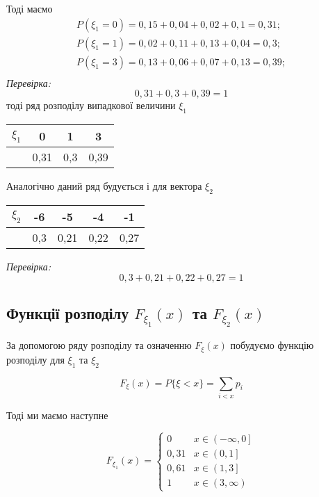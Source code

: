 \documentclass{article}
\begin{document}
	Тоді маємо
	$$
	\begin{gathered}
		P(\xi_1 = 0) = 0,15 + 0,04 + 0,02 + 0,1 = 0,31; \\
		P(\xi_1 = 1) =  0,02 + 0,11 + 0,13 + 0,04 = 0,3; \\
		P(\xi_1 = 3) = 0,13 + 0,06 + 0,07 + 0,13 = 0,39; \\
	\end{gathered}
	$$
	\textit{Перевірка:} \\
	$$0,31 + 0,3 + 0,39 = 1$$
	тоді ряд розподілу випадкової величини $\xi_1$
	\vspace{1ex}
	\begin{center}
	\begin{tabular}{|c|c|c|c|}
		\hline
		$\xi_1$ & 0 & 1 & 3 \\ \hline
		& 0,31 & 0,3 & 0,39 \\ \hline
	\end{tabular} 
	\end{center}
	
	Аналогічно даний ряд будується і для вектора $\xi_2$
	
	\begin{center}
		\begin{tabular}{|c|c|c|c|c|}
			\hline
			$\xi_2$ & -6 & -5 & -4 & -1 \\ \hline
			& 0,3 & 0,21 & 0,22 & 0,27 \\ \hline
		\end{tabular} 
	\end{center}
	\textit{Перевірка:} \\
	$$ 0,3 + 0,21 + 0,22 + 0,27 = 1$$
	
	\subsection{Функції розподілу $F_{\xi_1}(x)$ та $F_{\xi_2}(x)$}
	За допомогою ряду розподілу та означенню $F_{\xi}(x)$ побудуємо функцію розподілу для $\xi_1 \text{ та } \xi_2$
	
	$$F_{\xi}(x) = P \{\xi < x\} = \sum_{i<x}p_i$$
	
	Тоді ми маємо наступне
	
	$$
	F_{\xi_1}(x) =
	\begin{cases}
		0 & x\in\left(-\infty, 0\right] \\
		0,31 & x\in\left(0, 1\right] \\
		0,61 & x\in\left(1, 3\right] \\
		1 & x\in\left(3, \infty\right)
	\end{cases}
	$$
	
\end{document}
